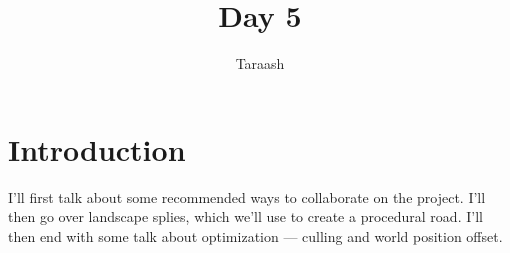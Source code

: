 \documentclass{article}
\title{Day 5}
\author{Taraash}
\date{}
\begin{document}
\newcommand{\img}[1]{
    \begin{figure*}[h]
        \centering
        \texttt{[image: day5images/image\#1.png]}
    \end{figure*}
}

\newcommand{\imgs}[2]{
    \begin{figure*}[h]
        \centering
        \texttt{[image: day5images/image\#1.png]}
    \end{figure*}
}

\newcommand{\imgc}[2]{
    \begin{figure*}[h]
        \centering
        \texttt{[image: day5images/image\#1.png]}
        \caption{#2}
    \end{figure*}
}
\newcommand{\imgcs}[3]{
    \begin{figure*}[h]
        \centering
        \texttt{[image: day5images/image\#1.png]}
        \caption{#2}
    \end{figure*}
}


	\maketitle
	
	\section{Introduction}
	I'll first talk about some recommended ways to collaborate on the project. I'll then go over landscape splies, which we'll use to create a procedural road. I'll then end with some talk about optimization --- culling and world position offset.
	
\end{document}
